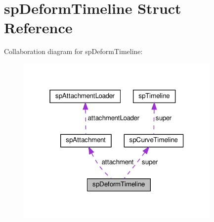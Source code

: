 \hypertarget{structspDeformTimeline}{}\section{sp\+Deform\+Timeline Struct Reference}
\label{structspDeformTimeline}


Collaboration diagram for sp\+Deform\+Timeline\+:
\nopagebreak
\begin{figure}[H]
\begin{center}
\leavevmode
\includegraphics[width=283pt]{structspDeformTimeline__coll__graph}
\end{center}
\end{figure}
